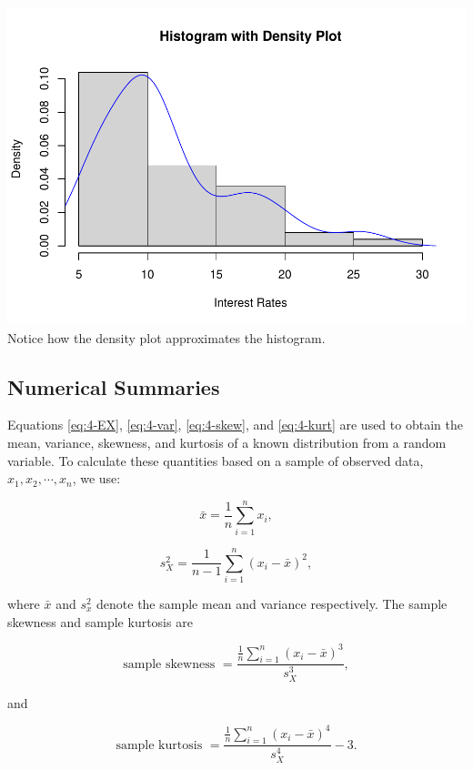 \documentclass[
]{book}
\begin{document}
\includegraphics{bookdown-demo_files/figure-latex/4-R3-1.pdf}
Notice how the density plot approximates the histogram.

\subsection{Numerical Summaries}\label{numerical-summaries}

Equations \eqref{eq:4-EX}, \eqref{eq:4-var}, \eqref{eq:4-skew}, and \eqref{eq:4-kurt} are used to obtain the mean, variance, skewness, and kurtosis of a known distribution from a random variable. To calculate these quantities based on a sample of observed data, \(x_1, x_2, \cdots, x_n\), we use:

\begin{equation} 
\bar{x} =  \frac{1}{n} \sum_{i=1}^n x_i,
\label{eq:4-xbar}
\end{equation}

\begin{equation} 
s_X^2 =  \frac{1}{n-1} \sum_{i=1}^n (x_i - \bar{x})^2,
\label{eq:4-sampvar}
\end{equation}

where \(\bar{x}\) and \(s_x^2\) denote the sample mean and variance respectively. The sample skewness and sample kurtosis are

\begin{equation} 
\text{sample skewness } =  \frac{\frac{1}{n} \sum_{i=1}^n (x_i - \bar{x})^3}{s_X^3},
\label{eq:4-sampskew}
\end{equation}

and

\begin{equation} 
\text{sample kurtosis } =  \frac{\frac{1}{n} \sum_{i=1}^n (x_i - \bar{x})^4}{s_X^4} - 3.
\label{eq:4-sampkurt}
\end{equation}
\end{document}

